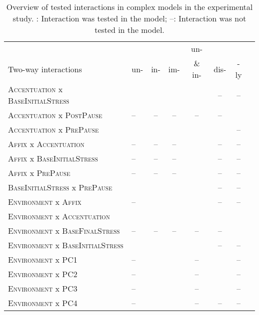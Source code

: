 \begin{table}\small
\caption{Overview of tested interactions in complex models in the experimental study. \checkmark: Interaction was tested in the model; --: Interaction was not tested in the model.\label{interactions experiments complex models}}
\begin{tabular}{llcccccc}\lsptoprule
	 & &&&{{un-}  }&  &\\
	{Two-way interactions} & {un-}&{in-}&{im-}&{\& {in-} }& {{dis-} }&{-ly}\\
	\midrule
	\textsc{Accentuation} x \textsc{BaseInitialStress}  &\checkmark &\checkmark&\checkmark&\checkmark&--&--\\		
	\textsc{Accentuation} x \textsc{PostPause}  &-- &--&--&--&--&\checkmark\\			
	\textsc{Accentuation} x \textsc{PrePause}  &\checkmark &\checkmark&\checkmark&\checkmark&\checkmark&--\\	
	\textsc{Affix} x \textsc{Accentuation}  &-- &--&--&\checkmark&--&--\\				
	\textsc{Affix} x \textsc{BaseInitialStress}  &-- &--&--&\checkmark&--&--\\				
	\textsc{Affix} x \textsc{PrePause}  &-- &--&--&\checkmark&--&--\\	
	\textsc{BaseInitialStress} x \textsc{PrePause}  &\checkmark &\checkmark&\checkmark&\checkmark&--&--\\	
	\textsc{Environment} x \textsc{Affix}  &-- &\checkmark&\checkmark&\checkmark&--&--\\
	\textsc{Environment} x \textsc{Accentuation}  &\checkmark&\checkmark&\checkmark&\checkmark&\checkmark&\checkmark\\
	\textsc{Environment} x \textsc{BaseFinalStress}  &-- &--&--&--&--&\checkmark\\		
	\textsc{Environment} x \textsc{BaseInitialStress}  &\checkmark &\checkmark&\checkmark&\checkmark&--&--\\
	\textsc{Environment} x \textsc{PC1}  &-- &\checkmark&\checkmark&--&\checkmark&--\\
	\textsc{Environment} x \textsc{PC2}  & --&\checkmark&\checkmark&--&\checkmark&--\\
	\textsc{Environment} x \textsc{PC3}  & --&\checkmark&\checkmark&--&\checkmark&--\\
	\textsc{Environment} x \textsc{PC4}  & --&\checkmark&\checkmark&--&--&--\\

\end{tabular}
\end{table}
